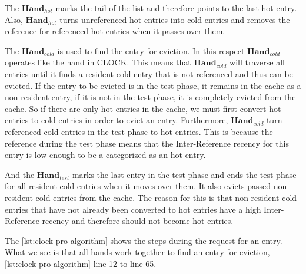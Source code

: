 \documentclass[
	12pt,
	a4paper,
	abstract,
	bibliography=totoc,
	chapterprefix,
	headings=openright,
	numbers=endperiod,
	parskip=half,
	twoside,
]{scrreprt}
\begin{document}
The $\textbf{Hand}_{hot}$ marks the tail of the list and therefore points to the last hot entry.
Also, $\textbf{Hand}_{hot}$ turns unreferenced hot entries into cold entries  and 
removes the reference for referenced hot entries when it passes over them.

The $\textbf{Hand}_{cold}$ is used to find the entry for eviction. 
In this respect $\textbf{Hand}_{cold}$ operates like the hand in CLOCK.
This means that $\textbf{Hand}_{cold}$ will traverse all entries until it finds a resident cold entry 
that is not referenced and thus can be evicted.
If the entry to be evicted is in the test phase, it remains in the cache as a non-resident entry, 
if it is not in the test phase, it is completely evicted from the cache.
So if there are only hot entries in the cache,  
we must first convert hot entries to cold entries in order to evict an entry.
Furthermore, $\textbf{Hand}_{cold}$ turn referenced cold entries in the test phase to hot entries. 
This is because the reference during the test phase means that the Inter-Reference recency for this entry is low enough 
to be a categorized as an hot entry.

And the $\textbf{Hand}_{test}$ marks the last entry in the test phase and ends the test phase for all resident cold entries when it moves over them. 
It also evicts passed non-resident cold entries from the cache.
The reason for this is that non-resident cold entries that have not already been converted to hot entries have a high Inter-Reference recency 
and therefore should not become hot entries.

The \cref{lst:clock-pro-algorithm} shows the steps during the request for an entry.
What we see is that all hands work together to find an entry for eviction, \cref{lst:clock-pro-algorithm} line 12 to line 65.

\bigskip
\newpage
\end{document}
